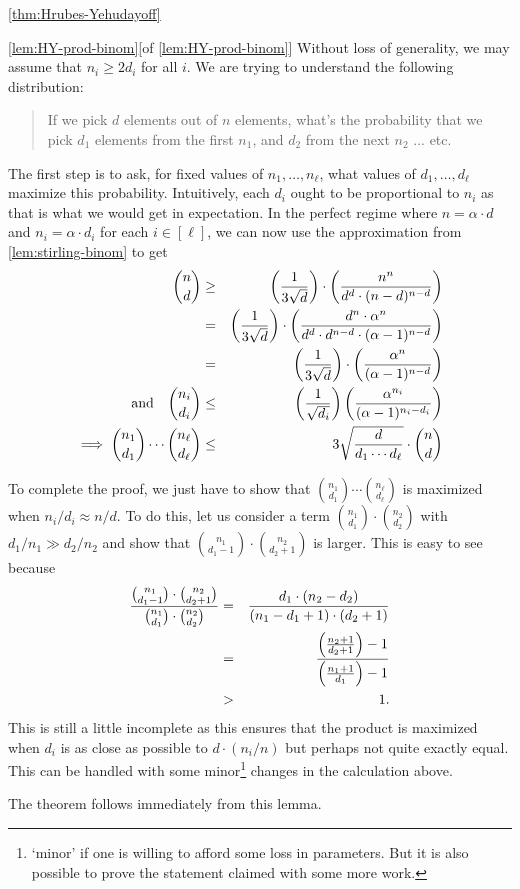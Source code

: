 \begin{proofof}{\autoref{thm:Hrubes-Yehudayoff}}
\begin{myproof}{\autoref{lem:HY-prod-binom}}[of \autoref{lem:HY-prod-binom}]
Without loss of generality, we may assume that $n_i \geq 2d_i$ for all $i$. We are trying to understand the following distribution:
\begin{quote}
  If we pick $d$ elements out of $n$ elements, what's the probability that we pick $d_1$ elements from the first $n_1$, and $d_2$ from the next $n_2$ ... etc. 
\end{quote}
The first step is to ask, for fixed values of $n_1, \ldots, n_\ell$, what values of $d_1, \ldots, d_\ell$ maximize this probability. Intuitively, each $d_i$ ought to be proportional to $n_i$ as that is what we would get in expectation. In the perfect regime where $n = \alpha \cdot  d$ and  $n_i = \alpha \cdot d_i$ for each $i \in [\ell]$, we can now use the approximation from \autoref{lem:stirling-binom} to get
\begin{eqnarray*}
\binom{n}{d} & \geq  &  \left(\frac{1}{3\sqrt{d}}\right) \cdot \left(\frac{n^n}{d^d \cdot (n-d)^{n-d}}\right)\\
 & = & \left(\frac{1}{3\sqrt{d}}\right) \cdot \left(\frac{d^n \cdot \alpha^n}{d^d \cdot d^{n-d} \cdot (\alpha - 1)^{n-d}}\right)\\
 & = & \left(\frac{1}{3\sqrt{d}}\right) \cdot \left(\frac{\alpha^n}{(\alpha - 1)^{n-d}}\right)\\
\text{and} \quad\binom{n_i}{d_i} & \leq  &  \left(\frac{1}{\sqrt{d_i}}\right) \left(\frac{\alpha^{n_i}}{(\alpha - 1)^{n_i-d_i}}\right)\\
\implies \binom{n_1}{d_1} \cdots \binom{n_\ell}{d_\ell}  & \leq & 3 \sqrt{\frac{d}{d_1 \cdots d_\ell}} \cdot \binom{n}{d}
\end{eqnarray*}

To complete the proof, we just have to show that $\binom{n_1}{d_1} \cdots \binom{n_\ell}{d_\ell}$ is maximized when $n_i/d_i \approx n/d$.
To do this, let us consider a term $\binom{n_1}{d_1} \cdot \binom{n_2}{d_2}$ with $d_1/n_1 \gg d_2/n_2$ and show that $\binom{n_1}{d_1 - 1} \cdot \binom{n_2}{d_2 + 1}$ is larger.
This is easy to see because
\begin{eqnarray*}
\frac{\binom{n_1}{d_1 - 1} \cdot \binom{n_2}{d_2 + 1}}{\binom{n_1}{d_1} \cdot \binom{n_2}{d_2}} & = & \frac{d_1 \cdot (n_2 - d_2)}{(n_1 - d_1 + 1) \cdot (d_2 + 1)}\\
 & = & \frac{\left(\frac{n_2 + 1}{d_2 + 1}\right) - 1 }{\left(\frac{n_1 + 1}{d_1}\right) - 1}\\
 & > & 1.
\end{eqnarray*}
This is still a little incomplete as this ensures that the product is maximized when $d_i$ is as close as possible to $d \cdot (n_i/n)$ but perhaps not quite exactly equal. This can be handled with some minor\footnote{`minor' if one is willing to afford some loss in parameters. But it is also possible to prove the statement claimed with some more work.} changes in the calculation above.  
\end{myproof}

\noindent
The theorem follows immediately from this lemma. 
\end{proofof}

